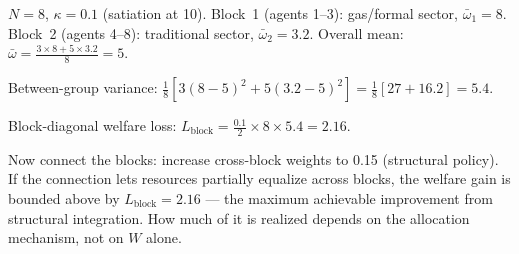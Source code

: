 \documentclass[../structural_economics_book.tex]{subfiles}
\begin{document}
\begin{example}\label{ch02:ex:two_blocks}
$N = 8$, $\kappa = 0.1$ (satiation at 10). Block~1 (agents 1--3): gas/formal sector, $\bar{\omega}_1 = 8$. Block~2 (agents 4--8): traditional sector, $\bar{\omega}_2 = 3.2$. Overall mean: $\bar{\omega} = \frac{3 \times 8 + 5 \times 3.2}{8} = 5$.

Between-group variance: $\frac{1}{8}[3(8-5)^2 + 5(3.2-5)^2] = \frac{1}{8}[27 + 16.2] = 5.4$.

Block-diagonal welfare loss: $L_{\text{block}} = \frac{0.1}{2}\times 8 \times 5.4 = 2.16$.

Now connect the blocks: increase cross-block weights to 0.15 (structural policy). If the connection lets resources partially equalize across blocks, the welfare gain is bounded above by $L_{\text{block}} = 2.16$ --- the maximum achievable improvement from structural integration. How much of it is realized depends on the allocation mechanism, not on $W$ alone.
\end{example}
\end{document}
